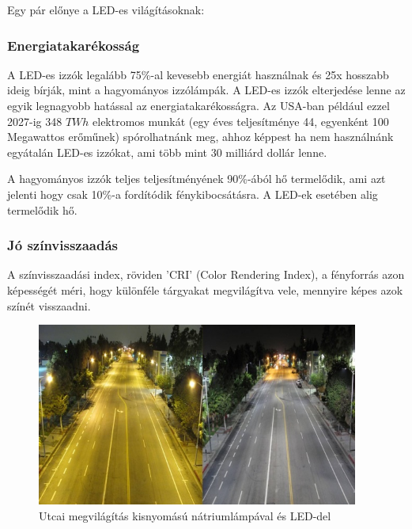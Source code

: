 \documentclass[../main.tex]{subfiles}
\begin{document}
    
    Egy pár előnye a LED-es világításoknak:
        \subsubsection{Energiatakarékosság} %
            A LED-es izzók legalább 75\%-al kevesebb energiát használnak és 25x hosszabb ideig bírják, mint a hagyományos izzólámpák. A LED-es izzók elterjedése lenne az egyik legnagyobb hatással az energiatakarékosságra. Az USA-ban például ezzel 2027-ig 348 $TWh$ elektromos munkát (egy éves teljesítménye 44, egyenként 100 Megawattos erőműnek) spórolhatnánk meg, ahhoz képpest ha nem használnánk egyátalán LED-es izzókat, ami több mint 30 milliárd dollár lenne.
            
            A hagyományos izzók teljes teljesítményének 90\%-ából hő termelődik, ami azt jelenti hogy csak 10\%-a fordítódik fénykibocsátásra. A LED-ek esetében alig termelődik hő.
        \subsubsection{Jó színvisszaadás}
            A színvisszaadási index, röviden 'CRI' (Color Rendering Index), a fényforrás azon képességét méri, hogy különféle tárgyakat megvilágítva vele, mennyire képes azok színét visszaadni. %
             \begin{figure}[h!] %
                \centering
                \includegraphics[height=6cm]{irodalom_res/cri_los_angeles.jpg}
                \caption{Utcai megvilágítás kisnyomású nátriumlámpával és LED-del} %
             \end{figure}
             
\end{document}
